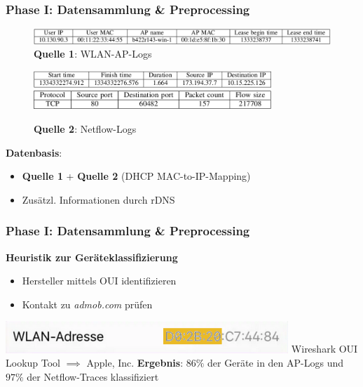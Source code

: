 \documentclass{beamer}
\begin{document}
\begin{frame}
  \frametitle{Phase I: Datensammlung \& Preprocessing}

  \begin{figure}
    \centering
    \includegraphics[width=\textwidth]{images/AP_entry.png}
    \caption*{\textbf{Quelle 1}: WLAN-AP-Logs}
  \end{figure}

  \begin{figure}
    \centering
    \includegraphics[width=0.8\textwidth]{images/netflow_entry_p1.png}
    \includegraphics[width=0.8\textwidth]{images/netflow_entry_p2.png}
    \caption*{\textbf{Quelle 2}: Netflow-Logs}
  \end{figure}
  
  \textbf{Datenbasis}:
  
  \begin{itemize}
    \item \textbf{Quelle 1} + \textbf{Quelle 2} (DHCP MAC-to-IP-Mapping)
    \item Zusätzl. Informationen durch rDNS
    
  \end{itemize}
      
\end{frame}

\begin{frame}
  \frametitle{Phase I: Datensammlung \& Preprocessing}
  \textbf{Heuristik zur Geräteklassifizierung}
  \begin{itemize}
    \item Hersteller mittels OUI identifizieren
    \item Kontakt zu \textit{admob.com} prüfen
  \end{itemize}
  \includegraphics[width=0.8\textwidth]{images/MAC_iPhone.png}\newline
  Wireshark OUI Lookup Tool $\implies$ Apple, Inc.\newline\newline
  \textbf{Ergebnis}: $86\%$ der Geräte in den AP-Logs und $97\%$ der Netflow-Traces klassifiziert
\end{frame}
\end{document}
